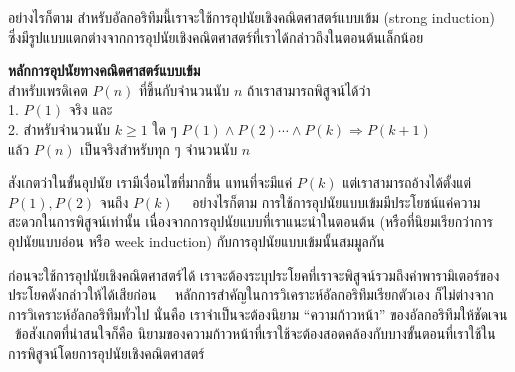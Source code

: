 อย่างไรก็ตาม สำหรับ{\wbr}อัล{\wbr}กอ{\wbr}ริ{\wbr}ทึม{\wbr}นี้{\wbr}เรา{\wbr}จะ{\wbr}ใช้{\wbr}การ{\wbr}อุปนัย{\wbr}เชิง{\wbr}คณิตศาสตร์{\wbr}แบบ{\wbr}เข้ม (strong
induction)
ซึ่ง{\wbr}มี{\wbr}รูปแบบ{\wbr}แตกต่าง{\wbr}จาก{\wbr}การ{\wbr}อุปนัย{\wbr}เชิง{\wbr}คณิตศาสตร์{\wbr}ที่{\wbr}เรา{\wbr}ได้{\wbr}กล่าว{\wbr}ถึง{\wbr}ใน{\wbr}ตอน{\wbr}ต้น{\wbr}เล็กน้อย{\wbr}

\framed\noindent
{\bf หลักการ{\wbr}อุปนัย{\wbr}ทาง{\wbr}คณิตศาสตร์{\wbr}แบบ{\wbr}เข้ม}\\
สำหรับ{\wbr}เพรดิเคต $P(n)$ ที่{\wbr}ขึ้น{\wbr}กับ{\wbr}จำนวนนับ $n$ ถ้า{\wbr}เรา{\wbr}สามารถ{\wbr}พิสูจน์{\wbr}ได้{\wbr}ว่า\\
1. $P(1)$ จริง และ\\
2. สำหรับ{\wbr}จำนวนนับ $k\geq 1$ ใด ๆ $P(1)\wedge P(2)\cdots\wedge P(k)\Rightarrow P(k+1)$\\
แล้ว $P(n)$ เป็นจริง{\wbr}สำหรับ{\wbr}ทุก ๆ จำนวนนับ $n$
\endframed

สังเกต{\wbr}ว่า{\wbr}ใน{\wbr}ขั้น{\wbr}อุปนัย เรา{\wbr}มี{\wbr}เงื่อนไข{\wbr}ที่{\wbr}มาก{\wbr}ขึ้น แทน{\wbr}ที่{\wbr}จะ{\wbr}มี{\wbr}แค่ $P(k)$ แต่{\wbr}เรา{\wbr}สามารถ{\wbr}อ้าง{\wbr}ได้{\wbr}ตั้งแต่{\wbr}
$P(1), P(2)$ จนถึง $P(k)$ \ \ อย่างไรก็ตาม{\wbr}
การ{\wbr}ใช้{\wbr}การ{\wbr}อุปนัย{\wbr}แบบ{\wbr}เข้ม{\wbr}มี{\wbr}ประโยชน์{\wbr}แค่{\wbr}ความ{\wbr}สะดวก{\wbr}ใน{\wbr}การ{\wbr}พิสูจน์{\wbr}เท่านั้น{\wbr}
เนื่องจาก{\wbr}การ{\wbr}อุปนัย{\wbr}แบบ{\wbr}ที่{\wbr}เรา{\wbr}แนะนำ{\wbr}ใน{\wbr}ตอน{\wbr}ต้น (หรือ{\wbr}ที่{\wbr}นิยม{\wbr}เรียก{\wbr}ว่า{\wbr}การ{\wbr}อุปนัย{\wbr}แบบ{\wbr}อ่อน หรือ week
induction) กับ{\wbr}การ{\wbr}อุปนัย{\wbr}แบบ{\wbr}เข้ม{\wbr}นั้น{\wbr}สม{\wbr}มูล{\wbr}กัน{\wbr}

ก่อน{\wbr}จะ{\wbr}ใช้{\wbr}การ{\wbr}อุปนัย{\wbr}เชิง{\wbr}คณิตศาสตร์{\wbr}ได้{\wbr}
เรา{\wbr}จะ{\wbr}ต้อง{\wbr}ระบุ{\wbr}ประโยค{\wbr}ที่{\wbr}เรา{\wbr}จะ{\wbr}พิสูจน์{\wbr}รวม{\wbr}ถึง{\wbr}ค่า{\wbr}พารามิเตอร์{\wbr}ของ{\wbr}ประโยค{\wbr}ดังกล่าว{\wbr}ให้{\wbr}ได้{\wbr}เสียก่อน{\wbr}
\ \ หลักการ{\wbr}สำคัญ{\wbr}ใน{\wbr}การ{\wbr}วิเคราะห์{\wbr}อัล{\wbr}กอ{\wbr}ริ{\wbr}ทึม{\wbr}เรียก{\wbr}ตัวเอง{\wbr}
ก็{\wbr}ไม่{\wbr}ต่าง{\wbr}จาก{\wbr}การ{\wbr}วิเคราะห์{\wbr}อัล{\wbr}กอ{\wbr}ริ{\wbr}ทึม{\wbr}ทั่วไป นั่น{\wbr}คือ เรา{\wbr}จำเป็น{\wbr}จะ{\wbr}ต้อง{\wbr}นิยาม ``ความ{\wbr}ก้าวหน้า''
ของ{\wbr}อัล{\wbr}กอ{\wbr}ริ{\wbr}ทึม{\wbr}ให้{\wbr}ชัดเจน \ ข้อสังเกต{\wbr}ที่{\wbr}น่า{\wbr}สนใจ{\wbr}ก็{\wbr}คือ{\wbr}
นิยาม{\wbr}ของ{\wbr}ความ{\wbr}ก้าวหน้า{\wbr}ที่{\wbr}เรา{\wbr}ใช้{\wbr}จะ{\wbr}ต้อง{\wbr}สอดคล้อง{\wbr}กับ{\wbr}บาง{\wbr}ขั้นตอน{\wbr}ที่{\wbr}เรา{\wbr}ใช้{\wbr}ใน{\wbr}การ{\wbr}พิสูจน์{\wbr}โดย{\wbr}การ{\wbr}อุปนัย{\wbr}เชิง{\wbr}คณิตศาสตร์{\wbr}

